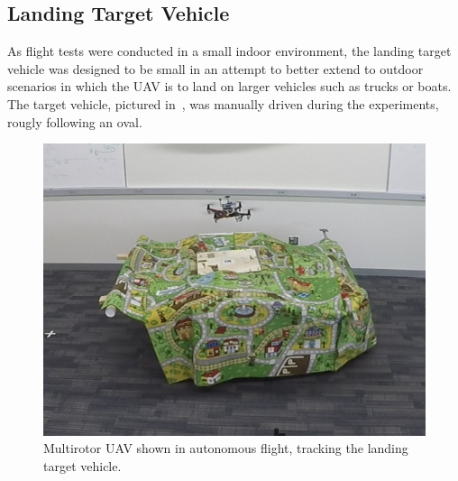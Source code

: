 
\subsection{Landing Target Vehicle}
As flight tests were conducted in a small indoor environment,
the landing target
vehicle was designed to be small in an attempt to better extend to outdoor
scenarios in which the UAV is to land on larger vehicles such as trucks or boats.
The target vehicle, pictured in~, was manually
driven during the experiments,
rougly following an oval.

\begin{figure}
  \centering
  \includegraphics[scale=0.5]{imgs/landing_vehicle.png}
  \caption[UAV Tracking the Target Vehicle During Flight Experiment]{Multirotor
    UAV shown in autonomous flight, tracking the landing target
  vehicle.}
  \label{fig:landing_vehicle}
\end{figure}
